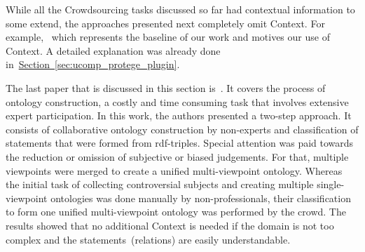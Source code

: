 While all the Crowdsourcing tasks discussed so far had contextual information to some extend, the approaches presented next completely omit Context. 
For example,~\cite{wohlgenannt2016} which represents the baseline of our work and motives our use of Context. A detailed explanation was already done in~\hyperref[sec:ucomp_protege_plugin]{Section~\ref*{sec:ucomp_protege_plugin}}.

The last paper that is discussed in this section is~\cite{zhitomirsky2017}. It covers the process of ontology construction, a costly and time consuming task that involves extensive expert participation. In this work, the authors presented a two-step approach. It consists of collaborative ontology construction by non-experts and classification of statements that were formed from \gls{rdf}-triples. Special attention was paid towards the reduction or omission of subjective or biased judgements. For that, multiple viewpoints were merged to create a unified multi-viewpoint ontology.
Whereas the initial task of collecting controversial subjects and creating multiple single-viewpoint ontologies was done manually by non-professionals, their classification to form one unified multi-viewpoint ontology was performed by the crowd. 
The results showed that no additional Context is needed if the domain is not too complex and the statements~(relations) are easily understandable.  


